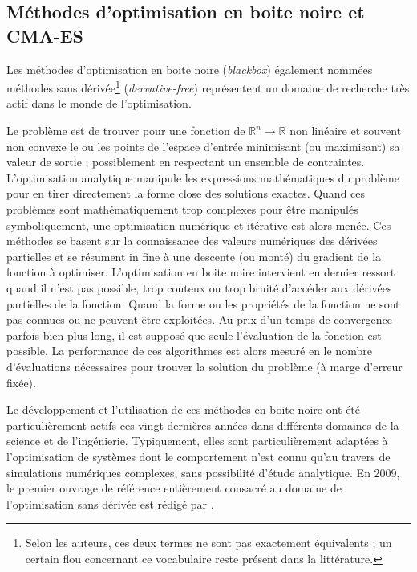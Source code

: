 \subsection{Méthodes d'optimisation en boite noire et CMA-ES\label{sec:blackbox}}

Les méthodes d'optimisation en boite noire (\textit{blackbox}) également 
nommées méthodes sans dérivée\footnote{Selon les auteurs, ces deux termes 
ne sont pas exactement équivalents ; un certain flou concernant ce vocabulaire 
reste présent dans la littérature.} (\textit{dervative-free}) représentent un
domaine de recherche très actif dans le monde de l'optimisation.

Le problème est de trouver pour une fonction de $\mathbb{R}^{n} \rightarrow \mathbb{R}$
non linéaire et souvent non convexe
le ou les points de l'espace d'entrée minimisant (ou maximisant) sa valeur
de sortie ; possiblement en respectant un ensemble de contraintes.
L'optimisation analytique manipule les expressions mathématiques du problème
pour en tirer directement la forme close des solutions exactes.
Quand ces problèmes sont mathématiquement trop complexes pour être
manipulés symboliquement, une optimisation numérique et itérative est
alors menée. Ces méthodes se basent sur la connaissance des valeurs 
numériques des dérivées partielles et se résument in fine à une
descente (ou monté) du gradient de la fonction à optimiser.
L'optimisation en boite noire intervient en dernier ressort quand 
il n'est pas possible, trop couteux ou trop bruité d'accéder aux 
dérivées partielles de la fonction.
Quand la forme ou les propriétés de la fonction ne
sont pas connues ou ne peuvent être exploitées.
Au prix d'un temps de convergence parfois bien plus long, il est supposé 
que seule l'évaluation de la fonction est possible.
La performance de ces algorithmes est alors mesuré en 
le nombre d'évaluations nécessaires pour trouver la solution
du problème (à marge d'erreur fixée).

Le développement et l'utilisation de ces méthodes en boite noire 
ont été particulièrement actifs ces vingt dernières années dans
différents domaines de la science et de l'ingénierie.
Typiquement, elles sont particulièrement adaptées à l'optimisation
de systèmes dont le comportement n'est connu qu'au travers de
simulations numériques complexes, sans possibilité d'étude analytique.
En 2009, le premier ouvrage de référence entièrement consacré 
au domaine de l'optimisation sans dérivée est rédigé 
par \cite{conn_introduction_2009}.


